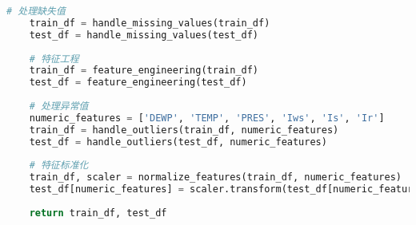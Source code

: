 \begin{lstlisting}[language=Python, caption=数据预处理实现, label=lst:preprocessing]
    # 处理缺失值
    train_df = handle_missing_values(train_df)
    test_df = handle_missing_values(test_df)
    
    # 特征工程
    train_df = feature_engineering(train_df)
    test_df = feature_engineering(test_df)
    
    # 处理异常值
    numeric_features = ['DEWP', 'TEMP', 'PRES', 'Iws', 'Is', 'Ir']
    train_df = handle_outliers(train_df, numeric_features)
    test_df = handle_outliers(test_df, numeric_features)
    
    # 特征标准化
    train_df, scaler = normalize_features(train_df, numeric_features)
    test_df[numeric_features] = scaler.transform(test_df[numeric_features])
    
    return train_df, test_df
\end{lstlisting}

